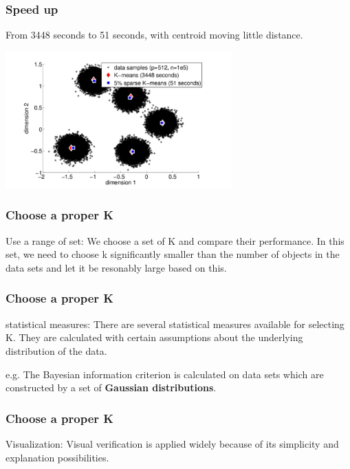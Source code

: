 \documentclass[9pt]{beamer}
\newcommand{\ccp}[1]{{\color{purple}#1}}
\begin{document}
\begin{frame}
	\frametitle{Speed up}
From 3448 seconds to 51 seconds, with centroid moving little distance.
\centerline{\includegraphics[width=0.65\textwidth]{figures/sparse.png}}

\end{frame}


\begin{frame}
	\frametitle{Choose a proper K}
	\ccp{Use a range of set}: We choose a set of K and compare their performance. In this set, we need to choose k \ccp{significantly smaller than the number of objects in the data sets and let it be resonably large based on this}.\par


\end{frame}

\begin{frame}
	\frametitle{Choose a proper K}
	\ccp{statistical measures}: There are several statistical measures available for selecting K. \ccp{They are calculated with certain assumptions about the underlying distribution of the data.} \par
	e.g. The Bayesian information criterion is calculated on data sets which are constructed by a set of \textbf{Gaussian distributions}. \par
\end{frame}

\begin{frame}
	\frametitle{Choose a proper K}
	\ccp{Visualization}: Visual verification is applied widely because of its simplicity and explanation possibilities.

\end{frame}
\end{document}
